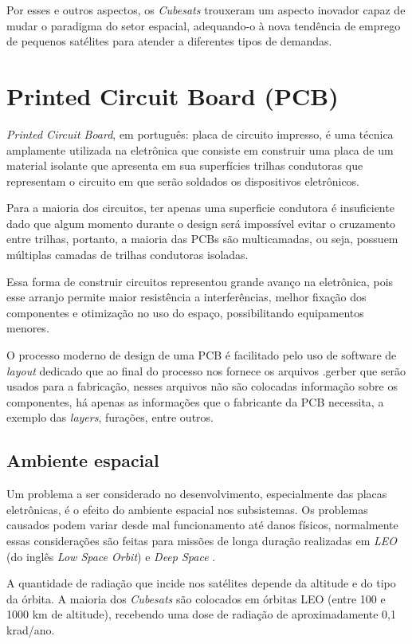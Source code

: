 Por esses e outros aspectos, os \textit{Cubesats} trouxeram um aspecto inovador capaz de mudar o paradigma do setor espacial, adequando-o à nova tendência de emprego de pequenos satélites para atender a diferentes tipos de demandas.

\section{Printed Circuit Board (PCB)}\label{pcb_revision}
\textit{Printed Circuit Board}, em português: placa de circuito impresso, é uma técnica amplamente utilizada na eletrônica que consiste em construir uma placa de um material isolante que apresenta em sua superfícies trilhas condutoras que representam o circuito em que serão soldados os dispositivos eletrônicos.

Para a maioria dos circuitos, ter apenas uma superficie condutora é insuficiente dado que algum momento durante o design será impossível evitar o cruzamento entre trilhas, portanto, a maioria das PCBs são multicamadas, ou seja, possuem múltiplas camadas de trilhas condutoras isoladas.

Essa forma de construir circuitos representou grande avanço na eletrônica, pois esse arranjo permite maior resistência a interferências, melhor fixação dos componentes e otimização no uso do espaço, possibilitando equipamentos menores.

O processo moderno de design de uma PCB é facilitado pelo uso de software de \textit{layout} dedicado que ao final do processo nos fornece os arquivos .gerber que serão usados para a fabricação, nesses arquivos não são colocadas informação sobre os componentes, há apenas as informações que o fabricante da PCB necessita, a exemplo das \textit{layers}, furações, entre outros.

\subsection{Ambiente espacial}
Um problema a ser considerado no desenvolvimento, especialmente das placas eletrônicas, é o efeito do ambiente espacial nos subsistemas. Os problemas causados podem variar desde mal funcionamento até danos físicos, normalmente essas considerações são feitas para missões de longa duração realizadas em \textit{LEO} (do inglês \textit{Low Space Orbit}) e \textit{Deep Space} \cite{nasa_state_of_art}.

A quantidade de radiação que incide nos satélites depende da altitude e do tipo da órbita. A maioria dos \textit{Cubesats} são colocados em órbitas LEO (entre 100 e 1000 km de altitude), recebendo uma dose de radiação de  aproximadamente 0,1 krad/ano.

